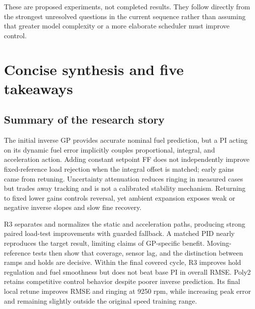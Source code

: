 \documentclass[11pt,a4paper,oneside]{report}
\begin{document}
These are proposed experiments, not completed results. They follow directly from the strongest unresolved questions in the current sequence rather than assuming that greater model complexity or a more elaborate scheduler must improve control.

\chapter{Concise synthesis and five takeaways}
\section{Summary of the research story}
The initial inverse GP provides accurate nominal fuel prediction, but a PI acting on its dynamic fuel error implicitly couples proportional, integral, and acceleration action. Adding constant setpoint FF does not independently improve fixed-reference load rejection when the integral offset is matched; early gains came from retuning. Uncertainty attenuation reduces ringing in measured cases but trades away tracking and is not a calibrated stability mechanism. Returning to fixed lower gains controls reversal, yet ambient expansion exposes weak or negative inverse slopes and slow fine recovery.

R3 separates and normalizes the static and acceleration paths, producing strong paired load-test improvements with guarded fallback. A matched PID nearly reproduces the target result, limiting claims of GP-specific benefit. Moving-reference tests then show that coverage, sensor lag, and the distinction between ramps and holds are decisive. Within the final covered cycle, R3 improves hold regulation and fuel smoothness but does not beat base PI in overall RMSE. Poly2 retains competitive control behavior despite poorer inverse prediction. Its final local retune improves RMSE and ringing at 9250 rpm, while increasing peak error and remaining slightly outside the original speed training range.
\end{document}
